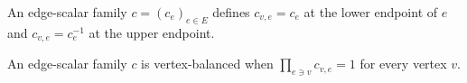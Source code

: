 \begin{definition}%
    \label{def:edgeScalarAt}
    \leanok
    An edge-scalar family $c=(c_e)_{e\in E}$ defines $c_{v,e}=c_e$ at the lower
    endpoint of $e$ and $c_{v,e}=c_e^{-1}$ at the upper endpoint.
\end{definition}

\begin{definition}%
    \label{def:IsVertexBalanced}
    \leanok
    An edge-scalar family $c$ is vertex-balanced when
    $\prod_{e\ni v}c_{v,e}=1$ for every vertex $v$.
\end{definition}
